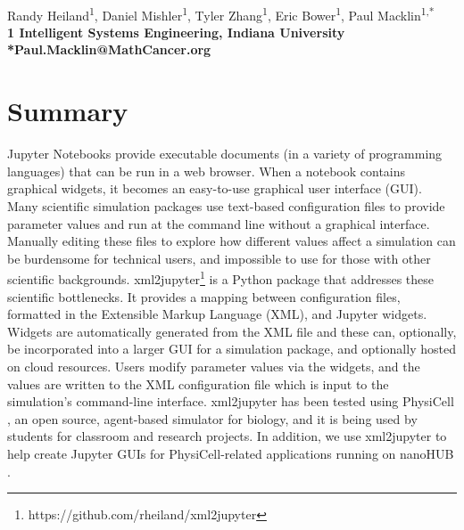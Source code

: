 \documentclass[10pt,letterpaper]{article}
\begin{document}
\vspace*{0.35in}

\begin{flushleft}
{\Large
\textbf{}
}
\newline
\\
Randy Heiland\textsuperscript{1},
Daniel Mishler\textsuperscript{1},
Tyler Zhang\textsuperscript{1},
Eric Bower\textsuperscript{1},
Paul Macklin\textsuperscript{1,*}
\\
\bigskip
\bf{1} Intelligent Systems Engineering, Indiana University
\bigskip
\\
*Paul.Macklin@MathCancer.org 

\end{flushleft}

\hypertarget{summary}{%
\section{Summary}\label{summary}}

Jupyter Notebooks \cite{Kluyver:2016aa,Nature_2018_Jupyter} provide
executable documents (in a variety of programming languages) that can be
run in a web browser. When a notebook contains graphical widgets, it
becomes an easy-to-use graphical user interface (GUI). Many scientific
simulation packages use text-based configuration files to provide
parameter values and run at the command line without a graphical
interface. Manually editing these files to explore how different values
affect a simulation can be burdensome for technical users, and
impossible to use for those with other scientific backgrounds.
xml2jupyter\footnote{https://github.com/rheiland/xml2jupyter} is a Python package that addresses these scientific
bottlenecks. It provides a mapping between configuration files,
formatted in the Extensible Markup Language (XML), and Jupyter widgets.
Widgets are automatically generated from the XML file and these can,
optionally, be incorporated into a larger GUI for a simulation package,
and optionally hosted on cloud resources. Users modify parameter values
via the widgets, and the values are written to the XML configuration
file which is input to the simulation's command-line interface.
xml2jupyter has been tested using PhysiCell \cite{PhysiCell:2018},
an open source, agent-based simulator for biology, and it is being used
by students for classroom and research projects. In addition, we use
xml2jupyter to help create Jupyter GUIs for PhysiCell-related
applications running on nanoHUB \cite{nanoHUB_2013}.
\end{document}
